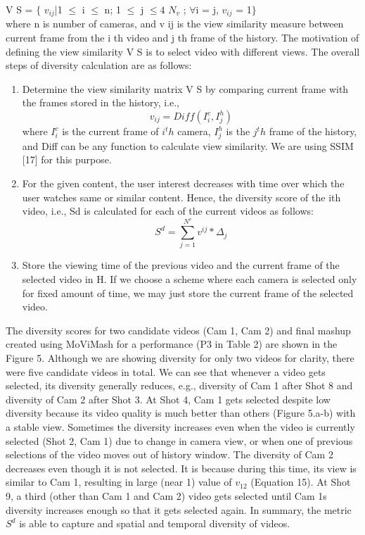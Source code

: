 \documentclass{sig-alternate}
\begin{document}
{{{V S = $\{$ $v_{ij}$|1 $\leq$ i $\leq$ n; 1 $\leq$ j $\leq4$ $N_v$ ; $\forall$i = j, $v_{ij}$ = 1$\}$\\


where n is number of cameras, and v ij is the view similarity
measure between current frame from the i th video and j th frame
of the history. The motivation of defining the view similarity V S is
to select video with different views. The overall steps of diversity
calculation are as follows:
\begin{enumerate}
    \item Determine the view similarity matrix V S by comparing current
frame with the frames stored in the history, i.e.,
$$
  v_{ij}=Diff({I^c_i},{I^h_j})
$$
where $I^c_i$ is the current frame of $i^th$ camera, $I^h_j$ is the $j^th$
frame of the history, and Diff can be any function to calculate
view similarity. We are using SSIM [17] for this purpose.

  \item For the given content, the user interest decreases with time
over which the user watches same or similar content. Hence,
the diversity score of the ith video, i.e., Sd is calculated for
each of the current videos as follows:
$$
  S^d=\sum^{N^v}_{j=1}v^{ij}*\Delta_j
$$
   \item Store the viewing time of the previous video and the current
frame of the selected video in H. If we choose a scheme
where each camera is selected only for fixed amount of time,
we may just store the current frame of the selected video.
\end{enumerate}

The diversity scores for two candidate videos (Cam 1, Cam 2)
and final mashup created using MoViMash for a performance (P3
in Table 2) are shown in the Figure 5. Although we are showing
diversity for only two videos for clarity, there were five candidate
videos in total. We can see that whenever a video gets selected,
its diversity generally reduces, e.g., diversity of Cam 1 after Shot 8
and diversity of Cam 2 after Shot 3. At Shot 4, Cam 1 gets selected
despite low diversity because its video quality is much better than
others (Figure 5.a-b) with a stable view. Sometimes the diversity
increases even when the video is currently selected (Shot 2, Cam 1)
due to change in camera view, or when one of previous selections
of the video moves out of history window. The diversity of Cam 2
decreases even though it is not selected. It is because during this
time, its view is similar to Cam 1, resulting in large (near 1) value
of $v_12$ (Equation 15). At Shot 9, a third (other than Cam 1 and Cam
2) video gets selected until Cam 1s diversity increases enough so
that it gets selected again. In summary, the metric $S^d$ is able to
capture and spatial and temporal diversity of videos.

}}}
\end{document}
